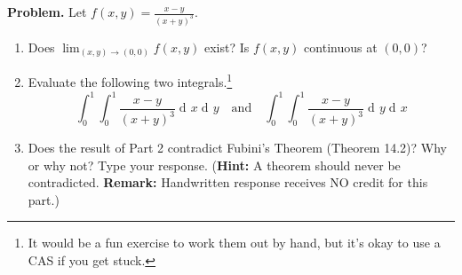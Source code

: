 \documentclass[10pt]{article}
\title{}
\date{}
\DeclareMathOperator{\xd}{d\!}
\begin{document}
\noindent
{\bf Problem.} 
Let $\displaystyle f(x,y) = \frac{x-y}{(x+y)^3}$.

\begin{enumerate}
\item
Does $\lim_{(x,y)\to(0,0)} f(x,y)$ exist? Is $f(x,y)$ continuous at $(0,0)$?
\item Evaluate the following two integrals.\footnote{It would be a fun exercise to work them out by hand, but it's okay to use a CAS if you get stuck.}
\[
\int_0^1\int_0^1 \frac{x-y}{(x+y)^3}\xd x\xd y\quad \text{and}\quad \int_0^1\int_0^1 \frac{x-y}{(x+y)^3}\xd y\xd x
\]

\item Does the result of Part 2 contradict Fubini's Theorem (Theorem 14.2)? Why or why not? Type your response. ({\bf Hint:} A theorem should never be contradicted. {\bf Remark:} Handwritten response receives NO credit for this part.)
\end{enumerate}
\end{document}
